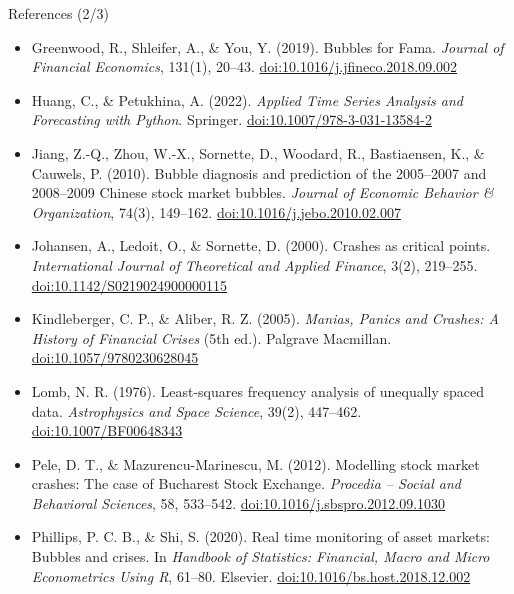\begin{frame}{References (2/3)}
\itemsize{\scriptsize}
\begin{itemize}
    \item Greenwood, R., Shleifer, A., \& You, Y. (2019). Bubbles for Fama. \textit{Journal of Financial Economics}, 131(1), 20--43. \href{https://doi.org/10.1016/j.jfineco.2018.09.002}{doi:10.1016/j.jfineco.2018.09.002}
    \item Huang, C., \& Petukhina, A. (2022). \textit{Applied Time Series Analysis and Forecasting with Python}. Springer. \href{https://doi.org/10.1007/978-3-031-13584-2}{doi:10.1007/978-3-031-13584-2}
    \item Jiang, Z.-Q., Zhou, W.-X., Sornette, D., Woodard, R., Bastiaensen, K., \& Cauwels, P. (2010). Bubble diagnosis and prediction of the 2005--2007 and 2008--2009 Chinese stock market bubbles. \textit{Journal of Economic Behavior \& Organization}, 74(3), 149--162. \href{https://doi.org/10.1016/j.jebo.2010.02.007}{doi:10.1016/j.jebo.2010.02.007}
    \item Johansen, A., Ledoit, O., \& Sornette, D. (2000). Crashes as critical points. \textit{International Journal of Theoretical and Applied Finance}, 3(2), 219--255. \href{https://doi.org/10.1142/S0219024900000115}{doi:10.1142/S0219024900000115}
    \item Kindleberger, C. P., \& Aliber, R. Z. (2005). \textit{Manias, Panics and Crashes: A History of Financial Crises} (5th ed.). Palgrave Macmillan. \href{https://doi.org/10.1057/9780230628045}{doi:10.1057/9780230628045}
    \item Lomb, N. R. (1976). Least-squares frequency analysis of unequally spaced data. \textit{Astrophysics and Space Science}, 39(2), 447--462. \href{https://doi.org/10.1007/BF00648343}{doi:10.1007/BF00648343}
    \item Pele, D. T., \& Mazurencu-Marinescu, M. (2012). Modelling stock market crashes: The case of Bucharest Stock Exchange. \textit{Procedia -- Social and Behavioral Sciences}, 58, 533--542. \href{https://doi.org/10.1016/j.sbspro.2012.09.1030}{doi:10.1016/j.sbspro.2012.09.1030}
    \item Phillips, P. C. B., \& Shi, S. (2020). Real time monitoring of asset markets: Bubbles and crises. In \textit{Handbook of Statistics: Financial, Macro and Micro Econometrics Using R}, 61--80. Elsevier. \href{https://doi.org/10.1016/bs.host.2018.12.002}{doi:10.1016/bs.host.2018.12.002}
\end{itemize}
\end{frame}

